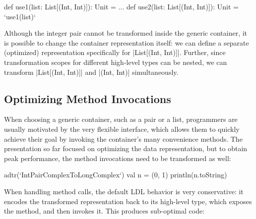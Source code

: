 \begin{lstlisting-nobreak}
def use1(list: List[(Int, Int)]): Unit = ...
def use2(list: List[(Int, Int)]): Unit = `use1(list)`
\end{lstlisting-nobreak}

Although the integer pair cannot be transformed inside the generic
container, it is possible to change the container representation
itself: we can define a separate (optimized) representation
specifically for |List[(Int, Int)]|. Further, since transformation
scopes for different high-level types can be nested, we can transform
|List[(Int, Int)]| and |(Int, Int)| simultaneously.



\subsection{Optimizing Method Invocations}
\label{sec:ildl:semantics}

When choosing a generic container, such as a pair or a list, programmers are usually motivated by the very flexible interface, which allows them to quickly achieve their goal by invoking the container's many convenience methods. The presentation so far focused on optimizing the data representation, but to obtain peak performance, the method invocations need to be transformed as well:

\begin{lstlisting-nobreak}
adtr(`IntPairComplexToLongComplex`) {
  val n = (0, 1)
  println(n.toString)
}
\end{lstlisting-nobreak}


When handling method calls, the default LDL behavior is very conservative: it encodes the transformed representation back to its high-level type, which exposes the method, and then invokes it. This produces sub-optimal code:

